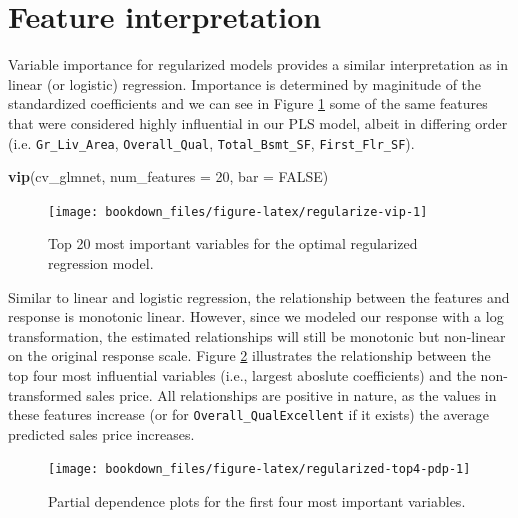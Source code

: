 \documentclass[]{krantz}
\makeatletter
\newenvironment{Shaded}{\begin{snugshade}}{\end{snugshade}}
\newcommand{\DataTypeTok}[1]{\textcolor[rgb]{0.27,0.27,0.27}{#1}}
\newcommand{\DecValTok}[1]{\textcolor[rgb]{0.06,0.06,0.06}{#1}}
\newcommand{\KeywordTok}[1]{\textcolor[rgb]{0.27,0.27,0.27}{\textbf{#1}}}
\newcommand{\NormalTok}[1]{#1}
\newcommand{\OtherTok}[1]{\textcolor[rgb]{0.37,0.37,0.37}{#1}}
\newenvironment{kframe}{%
\medskip{}
\setlength{\fboxsep}{.8em}
 \def\at@end@of@kframe{}%
 \ifinner\ifhmode%
  \def\at@end@of@kframe{\end{minipage}}%
  \begin{minipage}{\columnwidth}%
 \fi\fi%
 \def\FrameCommand##1{\hskip\@totalleftmargin \hskip-\fboxsep
 \colorbox{shadecolor}{##1}\hskip-\fboxsep
     \hskip-\linewidth \hskip-\@totalleftmargin \hskip\columnwidth}%
 \MakeFramed {\advance\hsize-\width
   \@totalleftmargin\z@ \linewidth\hsize
   \@setminipage}}%
 {\par\unskip\endMakeFramed%
 \at@end@of@kframe}
\renewenvironment{Shaded}{\begin{kframe}}{\end{kframe}}
\makeatother
\begin{document}
\hypertarget{lm-features}{%
\section{Feature interpretation}\label{lm-features}}

Variable importance for regularized models provides a similar interpretation as in linear (or logistic) regression. Importance is determined by maginitude of the standardized coefficients and we can see in Figure \ref{fig:regularize-vip} some of the same features that were considered highly influential in our PLS model, albeit in differing order (i.e. \texttt{Gr\_Liv\_Area}, \texttt{Overall\_Qual}, \texttt{Total\_Bsmt\_SF}, \texttt{First\_Flr\_SF}).

\begin{Shaded}
\begin{Highlighting}[]
\KeywordTok{vip}\NormalTok{(cv_glmnet, }\DataTypeTok{num_features =} \DecValTok{20}\NormalTok{, }\DataTypeTok{bar =} \OtherTok{FALSE}\NormalTok{)}
\end{Highlighting}
\end{Shaded}

\begin{figure}

{\centering \texttt{[image: bookdown\_files/figure-latex/regularize-vip-1]} 

}

\caption{Top 20 most important variables for the optimal regularized regression model.}\label{fig:regularize-vip}
\end{figure}

Similar to linear and logistic regression, the relationship between the features and response is monotonic linear. However, since we modeled our response with a log transformation, the estimated relationships will still be monotonic but non-linear on the original response scale. Figure \ref{fig:regularized-top4-pdp} illustrates the relationship between the top four most influential variables (i.e., largest aboslute coefficients) and the non-transformed sales price. All relationships are positive in nature, as the values in these features increase (or for \texttt{Overall\_QualExcellent} if it exists) the average predicted sales price increases.

\begin{figure}

{\centering \texttt{[image: bookdown\_files/figure-latex/regularized-top4-pdp-1]} 

}

\caption{Partial dependence plots for the first four most important variables.}\label{fig:regularized-top4-pdp}
\end{figure}
\end{document}

